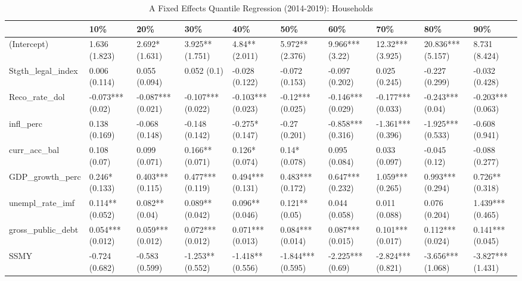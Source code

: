 \begin{table}[ht]
\centering
\caption{A Fixed Effects Quantile Regression (2014-2019): Households} 
\begingroup\small
\begin{tabular}{llllllllll}
  \toprule
 & 10\% & 20\% & 30\% & 40\% & 50\% & 60\% & 70\% & 80\% & 90\% \\ 
  \midrule
(Intercept) & 1.636 (1.823) & 2.692* (1.631) & 3.925** (1.751) & 4.84** (2.011) & 5.972** (2.376) & 9.966*** (3.22) & 12.32*** (3.925) & 20.836*** (5.157) & 8.731 (8.424) \\ 
  Stgth\_legal\_index & 0.006 (0.114) & 0.055 (0.094) & 0.052 (0.1) & -0.028 (0.122) & -0.072 (0.153) & -0.097 (0.202) & 0.025 (0.245) & -0.227 (0.299) & -0.032 (0.428) \\ 
  Reco\_rate\_dol & -0.073*** (0.02) & -0.087*** (0.021) & -0.107*** (0.022) & -0.103*** (0.023) & -0.12*** (0.025) & -0.146*** (0.029) & -0.177*** (0.033) & -0.243*** (0.04) & -0.203*** (0.063) \\ 
  infl\_perc & 0.138 (0.169) & -0.068 (0.148) & -0.148 (0.142) & -0.275* (0.147) & -0.27 (0.201) & -0.858*** (0.316) & -1.361*** (0.396) & -1.925*** (0.533) & -0.608 (0.941) \\ 
  curr\_acc\_bal & 0.108 (0.07) & 0.099 (0.071) & 0.166** (0.071) & 0.126* (0.074) & 0.14* (0.078) & 0.095 (0.084) & 0.033 (0.097) & -0.045 (0.12) & -0.088 (0.277) \\ 
  GDP\_growth\_perc & 0.246* (0.133) & 0.403*** (0.115) & 0.477*** (0.119) & 0.494*** (0.131) & 0.483*** (0.172) & 0.647*** (0.232) & 1.059*** (0.265) & 0.993*** (0.294) & 0.726** (0.318) \\ 
  unempl\_rate\_imf & 0.114** (0.052) & 0.082** (0.04) & 0.089** (0.042) & 0.096** (0.046) & 0.121** (0.05) & 0.044 (0.058) & 0.011 (0.088) & 0.076 (0.204) & 1.439*** (0.465) \\ 
  gross\_public\_debt & 0.054*** (0.012) & 0.059*** (0.012) & 0.072*** (0.012) & 0.071*** (0.013) & 0.084*** (0.014) & 0.087*** (0.015) & 0.101*** (0.017) & 0.112*** (0.024) & 0.141*** (0.045) \\ 
  SSMY & -0.724 (0.682) & -0.583 (0.599) & -1.253** (0.552) & -1.418** (0.556) & -1.844*** (0.595) & -2.225*** (0.69) & -2.824*** (0.821) & -3.656*** (1.068) & -3.827*** (1.431) \\ 
   \bottomrule
\end{tabular}
\endgroup
\end{table}
